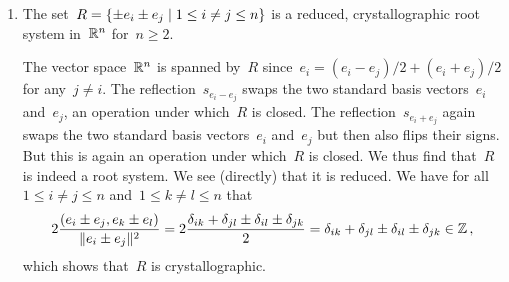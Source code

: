 \begin{examples}
\begin{enumerate}
    \item
      The set~$R = \{ \pm e_i \pm e_j \suchthat 1 \leq i \neq j \leq n \}$ is a reduced, crystallographic root system in~$\mathbb{R}^n$ for~$n \geq 2$.
      
      The vector space~$\mathbb{R}^n$ is spanned by~$R$ since~$e_i = (e_i - e_j)/2 + (e_i + e_j)/2$ for any~$j \neq i$.
      The reflection~$s_{e_i - e_j}$ swaps the two standard basis vectors~$e_i$ and~$e_j$, an operation under which~$R$ is closed.
      The reflection~$s_{e_i + e_j}$ again swaps the two standard basis vectors~$e_i$ and~$e_j$ but then also flips their signs.
      But this is again an operation under which~$R$ is closed.
      We thus find that~$R$ is indeed a root system.
      We see (directly) that it is reduced.
      We have for all~$1 \leq i \neq j \leq n$ and~$1 \leq k \neq l \leq n$ that
      \[
        2 \frac{(e_i \pm e_j, e_k \pm e_l)}{\lVert e_i \pm e_j\rVert^2}
        =
        2 \frac{\delta_{ik} + \delta_{jl} \pm \delta_{il} \pm \delta_{jk}}{2}
        =
        \delta_{ik} + \delta_{jl} \pm \delta_{il} \pm \delta_{jk}
        \in
        \mathbb{Z} \,,
      \]
      which shows that~$R$ is crystallographic.
      

\end{enumerate}
\end{examples}
